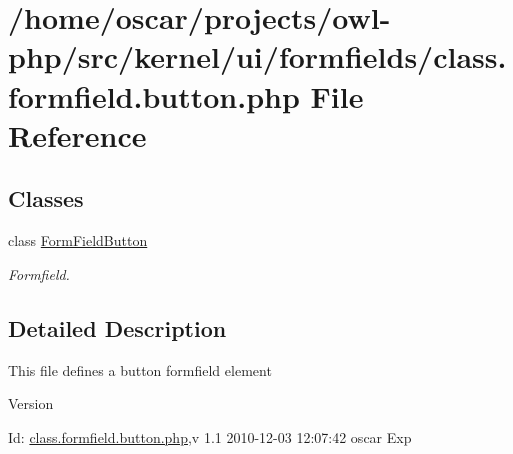\section{/home/oscar/projects/owl-\/php/src/kernel/ui/formfields/class.formfield.button.php File Reference}
\label{class_8formfield_8button_8php}
\subsection*{Classes}
\begin{DoxyCompactItemize}
\item 
class \hyperlink{classFormFieldButton}{FormFieldButton}
\begin{DoxyCompactList}\small\item\em Formfield. \item\end{DoxyCompactList}\end{DoxyCompactItemize}


\subsection{Detailed Description}
This file defines a button formfield element \begin{DoxyVersion}{Version}

\end{DoxyVersion}
\begin{DoxyParagraph}{Id:}
\hyperlink{class_8formfield_8button_8php}{class.formfield.button.php},v 1.1 2010-\/12-\/03 12:07:42 oscar Exp 
\end{DoxyParagraph}
